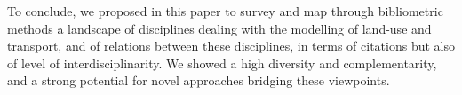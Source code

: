 \documentclass[10pt]{article}
\begin{document}
To conclude, we proposed in this paper to survey and map through bibliometric methods a landscape of disciplines dealing with the modelling of land-use and transport, and of relations between these disciplines, in terms of citations but also of level of interdisciplinarity. We showed a high diversity and complementarity, and a strong potential for novel approaches bridging these viewpoints.







%


\end{document}
